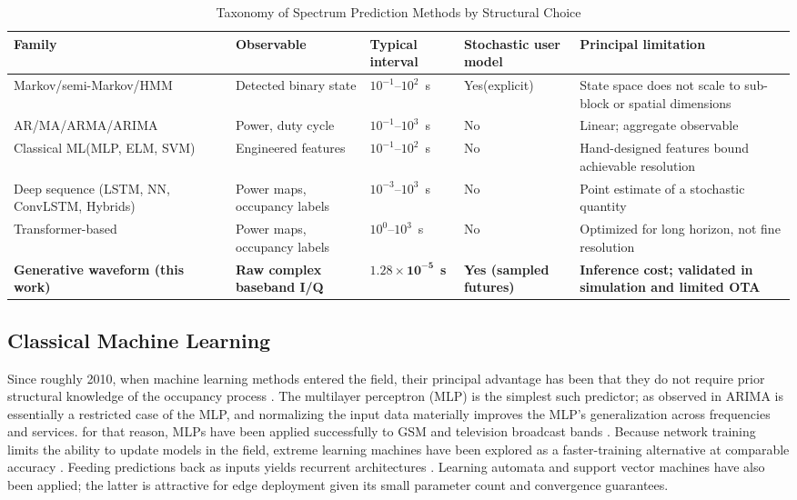\documentclass[lettersize,journal]{IEEEtran}
\begin{document}
\begin{table}[!t]
\centering
\caption{Taxonomy of Spectrum Prediction Methods by Structural Choice}
\label{tab:taxonomy}
\renewcommand{\arraystretch}{1.25}
\begin{tabular}{@{}p{3.0cm}p{3.4cm}p{2.6cm}p{2.2cm}p{4.0cm}@{}}
\toprule
\textbf{Family} & \textbf{Observable} & \textbf{Typical interval} &
\textbf{Stochastic user model} & \textbf{Principal limitation} \\
\midrule
Markov/semi-Markov/HMM &
Detected binary state &
$10^{-1}$--$10^{2}$~s &
Yes(explicit) &
State space does not scale to sub-block or spatial dimensions \\
AR/MA/ARMA/ARIMA &
Power, duty cycle &
$10^{-1}$--$10^{3}$~s &
No &
Linear; aggregate observable \\
Classical ML(MLP, ELM, SVM) &
Engineered features &
$10^{-1}$--$10^{2}$~s &
No &
Hand-designed features bound achievable resolution \\
Deep sequence (LSTM, NN, ConvLSTM, Hybrids) &
Power maps, occupancy labels &
$10^{-3}$--$10^{3}$~s &
No &
Point estimate of a stochastic quantity \\
Transformer-based &
Power maps, occupancy labels &
$10^{0}$--$10^{3}$~s &
No &
Optimized for long horizon, not fine resolution \\
\textbf{Generative waveform (this work)} &
\textbf{Raw complex baseband I/Q} &
$\mathbf{1.28\times10^{-5}}$~\textbf{s} &
\textbf{Yes (sampled futures)} &
\textbf{Inference cost; validated in simulation and limited OTA} \\
\bottomrule
\end{tabular}
\end{table}

\subsection{\textbf{Classical Machine Learning}}
Since roughly 2010, when machine learning methods entered the field, their
principal advantage has been that they do not require prior structural
knowledge of the occupancy process \cite{Tumuluru2010}.
The multilayer perceptron (MLP) is the simplest such predictor; as
observed in \cite{Yin2011} ARIMA is essentially a restricted case
of the MLP, and normalizing the input data materially improves the MLP's
generalization across frequencies and services.
for that reason, MLPs have been applied successfully to GSM \cite{Yin2011} 
and television broadcast bands
\cite{Winston2013}. Because network training limits the ability to update
models in the field, extreme learning machines have been explored as a
faster-training alternative at comparable accuracy \cite{Yang2014}.
Feeding predictions back as inputs yields recurrent architectures
\cite{Taj2011,Yang2013}. Learning automata \cite{Golestanian2014} and support
vector machines \cite{Ni2011} have also been applied; the latter is attractive
for edge deployment given its small parameter count and convergence guarantees.
\end{document}
